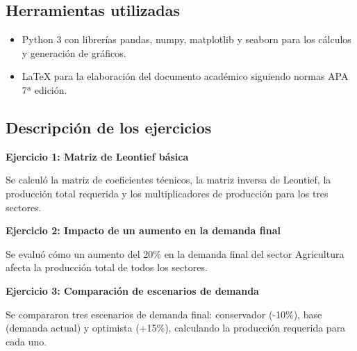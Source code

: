 \subsection{Herramientas utilizadas}

\begin{itemize}
    \item Python 3 con librerías pandas, numpy, matplotlib y seaborn para los cálculos y generación de gráficos.
    \item LaTeX para la elaboración del documento académico siguiendo normas APA 7ª edición.
\end{itemize}

\subsection{Descripción de los ejercicios}

\textbf{Ejercicio 1: Matriz de Leontief básica}

Se calculó la matriz de coeficientes técnicos, la matriz inversa de Leontief, la producción total requerida y los multiplicadores de producción para los tres sectores.

\textbf{Ejercicio 2: Impacto de un aumento en la demanda final}

Se evaluó cómo un aumento del 20\% en la demanda final del sector Agricultura afecta la producción total de todos los sectores.

\textbf{Ejercicio 3: Comparación de escenarios de demanda}

Se compararon tres escenarios de demanda final: conservador (-10\%), base (demanda actual) y optimista (+15\%), calculando la producción requerida para cada uno.

\clearpage
